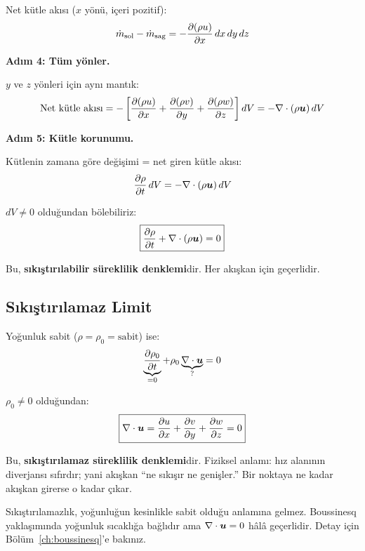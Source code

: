 Net kütle akısı ($x$ yönü, içeri pozitif):
\begin{equation}
    \dot{m}_{\text{sol}} - \dot{m}_{\text{sag}} = -\frac{\partial (\rho u)}{\partial x}\,dx\,dy\,dz
\end{equation}

\textbf{Adım 4: Tüm yönler.}

$y$ ve $z$ yönleri için aynı mantık:
\begin{equation}
    \text{Net kütle akısı} = -\left[\frac{\partial (\rho u)}{\partial x} + \frac{\partial (\rho v)}{\partial y} + \frac{\partial (\rho w)}{\partial z}\right] dV
    = -\nabla \cdot(\rho \bm{u}) \, dV
\end{equation}

\textbf{Adım 5: Kütle korunumu.}

Kütlenin zamana göre değişimi = net giren kütle akısı:
\begin{equation}
    \frac{\partial \rho}{\partial t}\,dV = -\nabla \cdot(\rho\bm{u})\,dV
\end{equation}

$dV \neq 0$ olduğundan bölebiliriz:
\begin{equation}
    \boxed{\frac{\partial \rho}{\partial t} + \nabla \cdot(\rho\bm{u}) = 0}
    \label{eq:continuity_compressible}
\end{equation}

Bu, \textbf{sıkıştırılabilir süreklilik denklemi}dir. Her akışkan için geçerlidir.

\subsection{Sıkıştırılamaz Limit}

Yoğunluk sabit ($\rho = \rho_0 = \text{sabit}$) ise:
\begin{equation}
    \underbrace{\frac{\partial \rho_0}{\partial t}}_{=0} + \rho_0 \underbrace{\nabla \cdot\bm{u}}_{\text{?}} = 0
\end{equation}

$\rho_0 \neq 0$ olduğundan:
\begin{equation}
    \boxed{\nabla \cdot\bm{u} = \frac{\partial u}{\partial x} + \frac{\partial v}{\partial y} + \frac{\partial w}{\partial z} = 0}
    \label{eq:continuity_incompressible}
\end{equation}

Bu, \textbf{sıkıştırılamaz süreklilik denklemi}dir. Fiziksel anlamı: hız alanının diverjansı sıfırdır; yani akışkan ``ne sıkışır ne genişler.'' Bir noktaya ne kadar akışkan girerse o kadar çıkar.

\begin{remark}
Sıkıştırılamazlık, yoğunluğun kesinlikle sabit olduğu anlamına gelmez. Boussinesq yaklaşımında yoğunluk sıcaklığa bağlıdır ama $\nabla \cdot\bm{u}=0$ hâlâ geçerlidir. Detay için Bölüm~\ref{ch:boussinesq}'e bakınız.
\end{remark}


